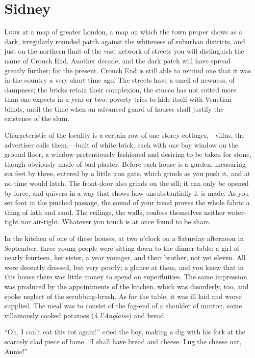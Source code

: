 \chapter{Sidney}

\textsc{Look} at a map of greater London, a map on which the town proper
shows as a dark, irregularly rounded patch against the whiteness of
suburban districts, and just on the northern limit of the vast network
of streets you will distinguish the name of Crouch End. Another decade,
and the dark patch will have spread greatly further; for the present.
Crouch End is still able to remind one that it was in the country a very
short time ago. The streets have a smell of newness, of dampness; the
bricks retain their complexion, the stucco has not rotted more than one
expects in a year or two; poverty tries to hide itself with Venetian
blinds, until the time when an advanced guard of houses shall justify
the existence of the slum.

Characteristic of the locality is a certain row of one-storey
cottages,---villas, the {}advertiser calls them,---built of white brick,
each with one bay window on the ground floor, a window pretentiously
fashioned and desiring to be taken for stone, though obviously made of
bad plaster. Before each house is a garden, measuring six feet by three,
entered by a little iron gate, which grinds as you push it, and at no
time would latch. The front-door also grinds on the sill; it can only be
opened by force, and quivers in a way that shows how unsubstantially it
is made. As you set foot in the pinched passage, the sound of your tread
proves the whole fabric a thing of lath and sand. The ceilings, the
walls, confess themselves neither water-tight nor air-tight. Whatever
you touch is at once found to be sham.

In the kitchen of one of these houses, at two o'clock on a Saturday
afternoon in September, three young people were sitting down to the
dinner-table: a girl of nearly fourteen, her sister, a year younger, and
their brother, not yet eleven. All were decently dressed, but very
poorly; a glance at them, and you knew that in this house there was
little money to spend on superfluities. The same impression {}was
produced by the appointments of the kitchen, which was disorderly, too,
and spoke neglect of the scrubbing-brush. As for the table, it was ill
laid and worse supplied. The meal was to consist of the fag-end of a
shoulder of mutton, some villainously cooked potatoes (\emph{à
l'Anglaise}) and bread.

``Oh, I can't eat this rot again!'' cried the boy, making a dig with his
fork at the scarcely clad piece of bone. ``I shall have bread and
cheese. Lug the cheese out, Annie!''

